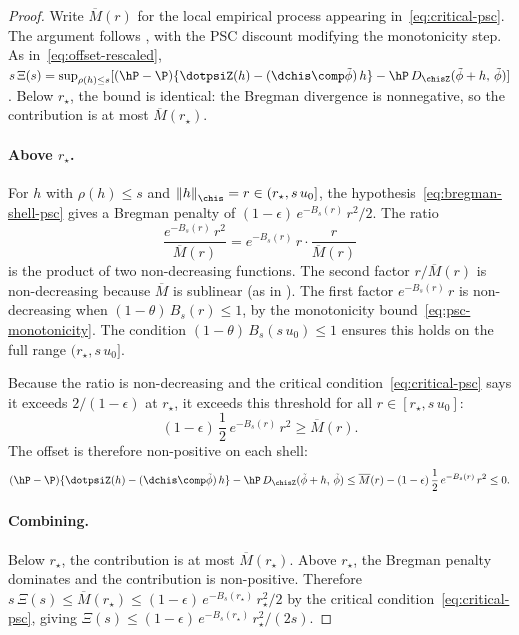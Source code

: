 \documentclass{article}
\begin{document}
\begin{proof}
Write $\overline{M}(r)$ for the local empirical process
appearing in~\eqref{eq:critical-psc}.
The argument follows ,
with the PSC discount modifying the monotonicity step.
As in~\eqref{eq:offset-rescaled},
$s\,\Xi(s) = \sup_{\rho(h) \le s}
  [(\hP - \P)\{\dotpsiZ(h) - (\dchis \comp \tilde\phi)\, h\}
    - \hP\, D_{\chisZ}(\tilde\phi + h,\, \tilde\phi)]$.
Below $r_\star$, the bound is identical:
the Bregman divergence is nonnegative,
so the contribution is at most $\overline{M}(r_\star)$.

\paragraph{Above $r_\star$.}
For $h$ with $\rho(h) \le s$
and $\norm{h}_{\chis} = r \in (r_\star, s\, u_0]$,
the hypothesis~\eqref{eq:bregman-shell-psc}
gives a Bregman penalty of
$(1-\epsilon)\, e^{-B_s(r)}\, r^2/2$.
The ratio
\[
\frac{e^{-B_s(r)}\, r^2}{\overline{M}(r)}
  = e^{-B_s(r)}\, r
    \cdot \frac{r}{\overline{M}(r)}
\]
is the product of two non-decreasing functions.
The second factor $r / \overline{M}(r)$
is non-decreasing because $\overline{M}$
is sublinear
(as in ).
The first factor $e^{-B_s(r)}\, r$
is non-decreasing when $(1-\theta)\, B_s(r) \le 1$,
by the monotonicity bound~\eqref{eq:psc-monotonicity}.
The condition $(1-\theta)\, B_s(s\, u_0) \le 1$
ensures this holds
on the full range $(r_\star, s\, u_0]$.

Because the ratio is non-decreasing
and the critical condition~\eqref{eq:critical-psc}
says it exceeds $2/(1-\epsilon)$ at $r_\star$,
it exceeds this threshold for all $r \in [r_\star, s\, u_0]$:
\[
(1-\epsilon)\, \frac{1}{2}\, e^{-B_s(r)}\, r^2
  \ge \overline{M}(r).
\]
The offset is therefore non-positive on each shell:
\[
(\hP - \P)\{\dotpsiZ(h) - (\dchis \comp \tilde\phi)\, h\}
  - \hP\, D_{\chisZ}(\tilde\phi + h,\, \tilde\phi)
  \le \overline{M}(r) - (1-\epsilon)\, \frac{1}{2}\, e^{-B_s(r)}\, r^2
  \le 0.
\]

\paragraph{Combining.}
Below $r_\star$, the contribution is at most $\overline{M}(r_\star)$.
Above $r_\star$, the Bregman penalty dominates
and the contribution is non-positive.
Therefore $s\,\Xi(s) \le \overline{M}(r_\star)
  \le (1-\epsilon)\, e^{-B_s(r_\star)}\, r_\star^2/2$
by the critical condition~\eqref{eq:critical-psc},
giving $\Xi(s) \le (1-\epsilon)\, e^{-B_s(r_\star)}\, r_\star^2/(2s)$.
\end{proof}
\end{document}
